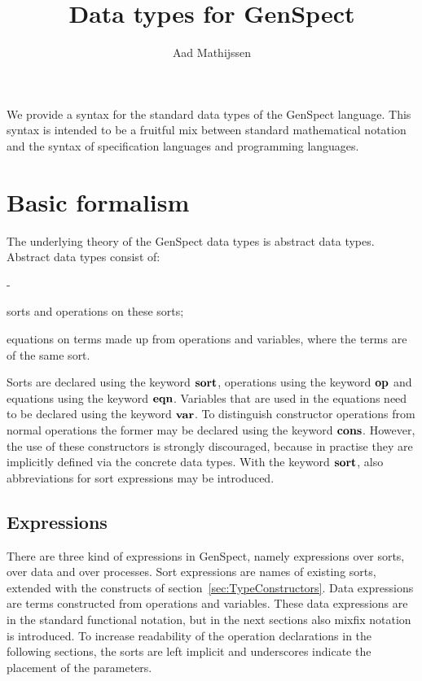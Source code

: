 \documentclass[a4paper,fleqn]{article}
\title{Data types for GenSpect}
\author{Aad Mathijssen}
\newenvironment{tdefinitions}[2][0.15em]
  {\begin{list}%
    {#2}%
    {\setlength{\parsep}{0pt}%
     \setlength{\itemsep}{#1}%
     \setlength{\leftmargin}{\mathindent}%
     \setlength{\labelwidth}{\mathindent - \labelsep}%
    }
  }
  {\end{list}}
\newcommand{\frm}[1]{\mbox{\ensuremath{#1}}}
\newlength{\tlength}
\newcommand{\kwsort}{{\bf sort}}
\newcommand{\kwcons}{{\bf cons}}
\newcommand{\kwmap}{{\bf op}}
\newcommand{\kwvar}{{\bf var}}
\newcommand{\kweqn}{{\bf eqn}}
\begin{document}
\maketitle

\noindent
We provide a syntax for the standard data types of the GenSpect language. This syntax is intended to be a fruitful mix between standard mathematical notation and the syntax of specification languages and programming languages.

\section{Basic formalism}

The underlying theory of the GenSpect data types is abstract data types. Abstract data types consist of:
\begin{tdefinitions}{-}
\item sorts and operations on these sorts;
\item equations on terms made up from operations and variables, where the terms are of the same sort.
\end{tdefinitions}

\noindent
Sorts are declared using the keyword \frm{\kwsort}, operations using the keyword \frm{\kwmap} and equations using the keyword \frm{\kweqn}. Variables that are used in the equations need to be declared using the keyword \frm{\kwvar}. To distinguish constructor operations from normal operations the former may be declared using the keyword \frm{\kwcons}. However, the use of these constructors is strongly discouraged, because in practise they are implicitly defined via the concrete data types. With the keyword \frm{\kwsort}, also abbreviations for sort expressions may be introduced.

\subsection{Expressions}

There are three kind of expressions in GenSpect, namely expressions over sorts, over data and over processes. Sort expressions are names of existing sorts, extended with the constructs of section~\ref{sec:TypeConstructors}. Data expressions are terms constructed from operations and variables. These data expressions are in the standard functional notation, but in the next sections also mixfix notation is introduced. To increase readability of the operation declarations in the following sections, the sorts are left implicit and underscores indicate the placement of the parameters.
\end{document}
